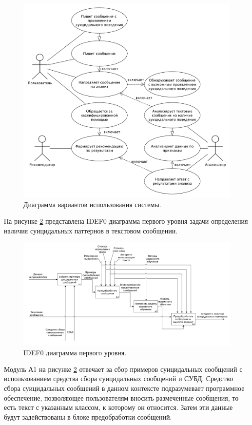 \begin{figure}[H]
	\centering
	\includegraphics[width=\textwidth]{inc/useCase.pdf}
	\caption{ Диаграмма вариантов использования системы. }
	\label{img:useCase}
\end{figure}

На рисунке \ref{img:idef1} представлена IDEF0 диаграмма первого уровня задачи определения наличия суицидальных паттернов в текстовом сообщении.

\begin{figure}[H]
	\centering
	\includegraphics[width=\textwidth]{inc/A1.pdf}
	\caption{ IDEF0 диаграмма первого уровня. }
	\label{img:idef1}
\end{figure}

Модуль А1 на рисунке \ref{img:idef1} отвечает за сбор примеров суицидальных сообщений с использованием средства сбора суицидальных сообщений и СУБД. 
Средство сбора суицидальных сообщений в данном контексте подразумевает программное обеспечение, позволяющее пользователям вносить размеченные сообщения, то есть текст с указанным классом, к которому он относится. 
Затем эти данные будут задействованы в блоке предобработки сообщений.

